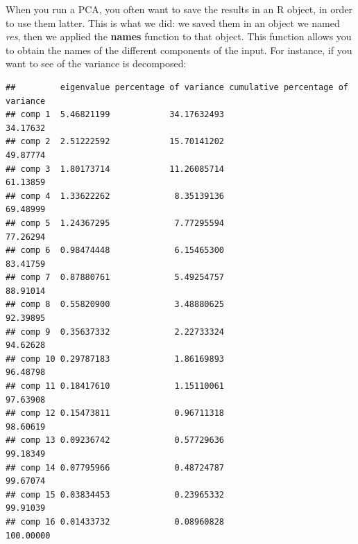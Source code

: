 \documentclass[
]{book}
\newenvironment{Shaded}{\begin{snugshade}}{\end{snugshade}}
\newcommand{\DecValTok}[1]{\textcolor[rgb]{0.00,0.00,0.81}{#1}}
\newcommand{\FunctionTok}[1]{\textcolor[rgb]{0.00,0.00,0.00}{#1}}
\newcommand{\NormalTok}[1]{#1}
\newcommand{\SpecialCharTok}[1]{\textcolor[rgb]{0.00,0.00,0.00}{#1}}
\begin{document}
When you run a PCA, you often want to save the results in an R object, in order to use them latter. This is what we did: we saved them in an object we named \emph{res}, then we applied the \textbf{names} function to that object. This function allows you to obtain the names of the different components of the input. For instance, if you want to see of the variance is decomposed:

\begin{Shaded}
\end{Shaded}

\begin{verbatim}
##         eigenvalue percentage of variance cumulative percentage of variance
## comp 1  5.46821199            34.17632493                          34.17632
## comp 2  2.51222592            15.70141202                          49.87774
## comp 3  1.80173714            11.26085714                          61.13859
## comp 4  1.33622262             8.35139136                          69.48999
## comp 5  1.24367295             7.77295594                          77.26294
## comp 6  0.98474448             6.15465300                          83.41759
## comp 7  0.87880761             5.49254757                          88.91014
## comp 8  0.55820900             3.48880625                          92.39895
## comp 9  0.35637332             2.22733324                          94.62628
## comp 10 0.29787183             1.86169893                          96.48798
## comp 11 0.18417610             1.15110061                          97.63908
## comp 12 0.15473811             0.96711318                          98.60619
## comp 13 0.09236742             0.57729636                          99.18349
## comp 14 0.07795966             0.48724787                          99.67074
## comp 15 0.03834453             0.23965332                          99.91039
## comp 16 0.01433732             0.08960828                         100.00000
\end{verbatim}

\begin{Shaded}
\end{Shaded}
\end{document}
